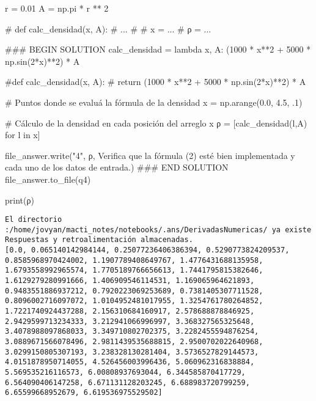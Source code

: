 \documentclass[
  letterpaper,
  DIV=11,
  numbers=noendperiod]{scrreprt}
\newenvironment{Shaded}{\begin{snugshade}}{\end{snugshade}}
\newcommand{\BuiltInTok}[1]{\textcolor[rgb]{0.00,0.23,0.31}{#1}}
\newcommand{\CommentTok}[1]{\textcolor[rgb]{0.37,0.37,0.37}{#1}}
\newcommand{\ControlFlowTok}[1]{\textcolor[rgb]{0.00,0.23,0.31}{#1}}
\newcommand{\DecValTok}[1]{\textcolor[rgb]{0.68,0.00,0.00}{#1}}
\newcommand{\FloatTok}[1]{\textcolor[rgb]{0.68,0.00,0.00}{#1}}
\newcommand{\KeywordTok}[1]{\textcolor[rgb]{0.00,0.23,0.31}{#1}}
\newcommand{\NormalTok}[1]{\textcolor[rgb]{0.00,0.23,0.31}{#1}}
\newcommand{\OperatorTok}[1]{\textcolor[rgb]{0.37,0.37,0.37}{#1}}
\newcommand{\RegionMarkerTok}[1]{\textcolor[rgb]{0.00,0.23,0.31}{#1}}
\newcommand{\StringTok}[1]{\textcolor[rgb]{0.13,0.47,0.30}{#1}}
\begin{document}
\begin{Shaded}
\begin{Highlighting}[]
\NormalTok{r }\OperatorTok{=} \FloatTok{0.01}
\NormalTok{A }\OperatorTok{=}\NormalTok{ np.pi }\OperatorTok{*}\NormalTok{ r }\OperatorTok{**} \DecValTok{2}

\CommentTok{\# def calc\_densidad(x, A):}
\CommentTok{\#     ...}
\CommentTok{\#}
\CommentTok{\# x = ...}
\CommentTok{\# ρ = ...}

\CommentTok{\#\#\# }\RegionMarkerTok{BEGIN}\CommentTok{ SOLUTION}
\NormalTok{calc\_densidad }\OperatorTok{=} \KeywordTok{lambda}\NormalTok{ x, A: (}\DecValTok{1000} \OperatorTok{*}\NormalTok{ x}\OperatorTok{**}\DecValTok{2} \OperatorTok{+} \DecValTok{5000} \OperatorTok{*}\NormalTok{ np.sin(}\DecValTok{2}\OperatorTok{*}\NormalTok{x)}\OperatorTok{**}\DecValTok{2}\NormalTok{) }\OperatorTok{*}\NormalTok{ A}

\CommentTok{\#def calc\_densidad(x, A):}
\CommentTok{\#    return (1000 * x**2 + 5000 * np.sin(2*x)**2) * A}

\CommentTok{\# Puntos donde se evaluá la fórmula de la densidad}
\NormalTok{x }\OperatorTok{=}\NormalTok{ np.arange(}\FloatTok{0.0}\NormalTok{, }\FloatTok{4.5}\NormalTok{, }\FloatTok{.1}\NormalTok{)}

\CommentTok{\# Cálculo de la densidad en cada posición del arreglo x}
\NormalTok{ρ }\OperatorTok{=}\NormalTok{ [calc\_densidad(l,A) }\ControlFlowTok{for}\NormalTok{ l }\KeywordTok{in}\NormalTok{ x]}
    
\NormalTok{file\_answer.write(}\StringTok{"4"}\NormalTok{, ρ, }\StringTok{\textquotesingle{}Verifica que la fórmula (2) esté bien implementada y cada uno de los datos de entrada.\textquotesingle{}}\NormalTok{)}
\CommentTok{\#\#\# }\RegionMarkerTok{END}\CommentTok{ SOLUTION}
\NormalTok{file\_answer.to\_file(}\StringTok{\textquotesingle{}q4\textquotesingle{}}\NormalTok{)}

\BuiltInTok{print}\NormalTok{(ρ)}
\end{Highlighting}
\end{Shaded}

\begin{verbatim}
El directorio :/home/jovyan/macti_notes/notebooks/.ans/DerivadasNumericas/ ya existe
Respuestas y retroalimentación almacenadas.
[0.0, 0.065140142984144, 0.25077236406386394, 0.5290773824209537, 0.8585968970424002, 1.1907789408649767, 1.4776431688135958, 1.6793558992965574, 1.7705189766656613, 1.7441795815382646, 1.6129279280991666, 1.406909546114531, 1.169065964621893, 0.9483551886937212, 0.7920223069253689, 0.7381405307711528, 0.8096002716097072, 1.0104952481017955, 1.3254761780264852, 1.7221740924437288, 2.156310684160917, 2.578688878846925, 2.9429599713234333, 3.212941066996997, 3.368327565325648, 3.4078988097868033, 3.349710802702375, 3.2282455594876254, 3.0889671566078496, 2.9811439535688815, 2.9500702022640968, 3.0299150805307193, 3.238328130281404, 3.5736527829144573, 4.0151878950714055, 4.526456003996436, 5.060962316838884, 5.569535216116573, 6.00808937693044, 6.344585870417729, 6.564090406147258, 6.671131128203245, 6.688983720799259, 6.65599668952679, 6.619536975529502]
\end{verbatim}
\end{document}

